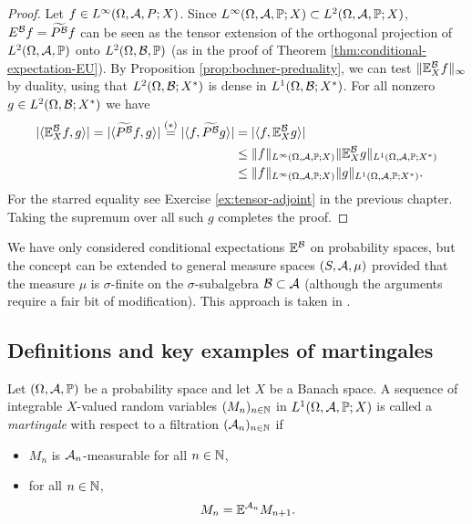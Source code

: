 {\begin{proof}
  Let $f \in L^\infty(\Omega,\mathcal{A},P;X)$.
  Since $L^\infty(\Omega,\mathcal{A},\mathbb{P};X) \subset L^2(\Omega,\mathcal{A},\mathbb{P};X)$, $E^{\mathcal{B}} f = \widetilde{P^{\mathcal{B}}} f$ can be seen as the tensor extension of the orthogonal projection of $L^2(\Omega,\mathcal{A},\mathbb{P})$ onto $L^2(\Omega, \mathcal{B},\mathbb{P})$ (as in the proof of Theorem \ref{thm:conditional-expectation-EU}).
  By Proposition \ref{prop:bochner-preduality}, we can test $\|\mathbb{E}_X^{\mathcal{B}} f\|_\infty$ by duality, using that $L^2(\Omega,\mathcal{B}; X^*)$ is dense in $L^1(\Omega, \mathcal{B}; X^*)$.
  For all nonzero $g \in L^2(\Omega, \mathcal{B}; X^*)$ we have
\begin{equation*}
  \begin{aligned}
    | \langle \mathbb{E}_X^{\mathcal{B}} f, g \rangle |
    =  | \langle \widetilde{P^{\mathcal{B}}} f, g \rangle | 
    \stackrel{(*)}{=} | \langle f, \widetilde{P^{\mathcal{B}}} g \rangle | 
    &=  | \langle f, \mathbb{E}_X^{\mathcal{B}} g \rangle | \\
    &\leq  \|f\|_{L^\infty(\Omega,\mathcal{A},\mathbb{P};X)} \|\mathbb{E}_X^{\mathcal{B}} g\|_{L^1(\Omega,\mathcal{A},\mathbb{P};X^*)} \\
    &\leq  \|f\|_{L^\infty(\Omega,\mathcal{A},\mathbb{P};X)} \| g\|_{L^1(\Omega,\mathcal{A},\mathbb{P};X^*)}.
  \end{aligned}
\end{equation*}
For the starred equality see Exercise \ref{ex:tensor-adjoint} in the previous chapter.
Taking the supremum over all such $g$ completes the proof.
\end{proof}

}



\begin{rmk}
  We have only considered conditional expectations $\mathbb{E}^{\mathcal{B}}$ on probability spaces, but the concept can be extended to general measure spaces $(S,\mathcal{A},\mu)$ provided that the measure $\mu$ is $\sigma$-finite on the $\sigma$-subalgebra $\mathcal{B} \subset \mathcal{A}$ (although the arguments require a fair bit of modification).
  This approach is taken in \cite{HNVW16}.
\end{rmk}


\subsection{Definitions and key examples of martingales}

\begin{defn}
  Let $(\Omega, \mathcal{A}, \mathbb{P})$ be a probability space and let $X$ be a Banach space.
  A sequence of integrable $X$-valued random variables $(M_n)_{n \in \mathbb{N}}$ in $L^1(\Omega, \mathcal{A}, \mathbb{P}; X)$ is called a \emph{martingale} with respect to a filtration $(\mathcal{A}_n)_{n \in \mathbb{N}}$ if
  \begin{itemize}
  \item $M_n$ is $\mathcal{A}_n$-measurable for all $n \in \mathbb{N}$,
  \item for all $n \in \mathbb{N}$,
    \begin{equation}\label{eq:mgale-defining-property}
      M_n = \mathbb{E}^{\mathcal{A}_n} M_{n+1}.
    \end{equation}
  \end{itemize}
\end{defn}

